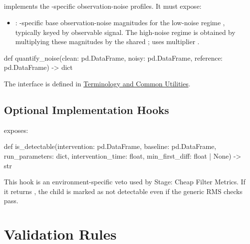 \documentclass[11pt]{article}
\begin{document}
\label{sec:environment-noise-adder}
\subsection*{\texorpdfstring{}{noise\_adder.py}}

 implements the \termSimulator-specific observation-noise profiles.
It must expose:

\begin{itemize}
\item {}: \termSimulator-specific base observation-noise magnitudes for the low-noise regime , typically keyed by observable signal. 
The high-noise regime is obtained by multiplying these magnitudes by the shared ;  uses multiplier .
\label{def:noise-adder-interface}
\end{itemize}

\begin{DocCode}
def quantify_noise(clean: pd.DataFrame, noisy: pd.DataFrame, reference: pd.DataFrame) -> dict
\end{DocCode}

The  interface is defined in \hyperref[def:add-noise-utility]{Terminology and Common Utilities}.

\label{sec:environment-detectability-specific}
\subsection*{Optional Implementation Hooks}

 exposes:

\begin{DocCode}
def is_detectable(intervention: pd.DataFrame, baseline: pd.DataFrame, run_parameters: dict, intervention_time: float, min_first_diff: float | None) -> str
\end{DocCode}

This hook is an environment-specific veto used by Stage: Cheap Filter Metrics.
If it returns , the child is marked as not detectable even if the generic RMS checks pass.


\section*{Validation Rules}
\label{sec:environment-validation-rules}
\end{document}
